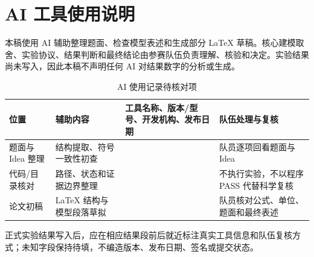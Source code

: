 \clearpage
\section*{AI 工具使用说明}
本稿使用 AI 辅助整理题面、检查模型表述和生成部分 LaTeX 草稿。核心建模取舍、实验协议、结果判断和最终结论由参赛队伍负责理解、核验和决定。实验结果尚未写入，因此本稿不声明任何 AI 对结果数字的分析或生成。
\begin{table}[H]\centering\caption{AI 使用记录待核对项}
\begin{tabularx}{\linewidth}{lYYY}\toprule
位置 & 辅助内容 & 工具名称、版本/型号、开发机构、发布日期 & 队伍处理与复核\\\midrule
题面与 Idea 整理 & 结构提取、符号一致性初查 &  & 队员逐项回看题面与 Idea\\
代码/目录核对 & 路径、状态和证据边界整理 &  & 不执行实验，不以程序 PASS 代替科学复核\\
论文初稿 & LaTeX 结构与模型段落草拟 &  & 队员核对公式、单位、题面和最终表述\\\bottomrule
\end{tabularx}\end{table}
正式实验结果写入后，应在相应结果段前后就近标注真实工具信息和队伍复核方式；未知字段保持待填，不编造版本、发布日期、签名或提交状态。
